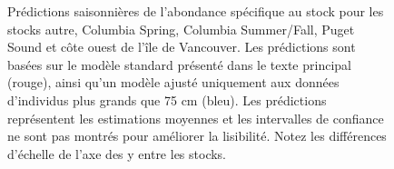 \begin{figure}[H]
    \centering
    \caption{Prédictions saisonnières de l'abondance spécifique au stock pour les stocks autre, Columbia Spring, Columbia Summer/Fall, Puget Sound et côte ouest de l'île de Vancouver. Les prédictions sont basées sur le modèle standard présenté dans le texte principal (rouge), ainsi qu'un modèle ajusté uniquement aux données d'individus plus grands que 75 cm (bleu). Les prédictions représentent les estimations moyennes et les intervalles de confiance ne sont pas montrés pour améliorer la lisibilité. Notez les différences d'échelle de l'axe des y entre les stocks.}
    \label{fig:comb-pred-stock1}
\end{figure}

